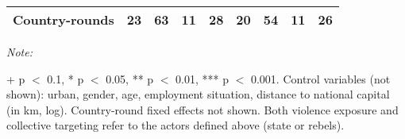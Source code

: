 \begin{table}[!h]
{\begin{threeparttable}
\begin{tabular}[t]{lcccccccc}
Country-rounds & 23 & 63 & 11 & 28 & 20 & 54 & 11 & 26\\
\bottomrule
\end{tabular}
\begin{tablenotes}[para]
\item \textit{Note: } 
\item + p $<$ 0.1, * p $<$ 0.05, ** p $<$ 0.01, *** p $<$ 0.001. Control variables (not shown): urban, gender, age, employment situation, distance to national capital (in km, log). Country-round fixed effects not shown. Both violence exposure and collective targeting refer to the actors defined above (state or rebels).
\end{tablenotes}
\end{threeparttable}}
\end{table}
